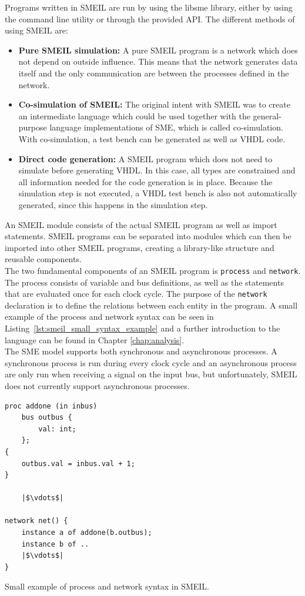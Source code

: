 Programs written in SMEIL are run by using the libsme library, either by using the command line utility or through the provided API.
The different methods of using SMEIL are:\\
\begin{itemize}
    \item \textbf{Pure SMEIL simulation:} A pure SMEIL program is a network which does not depend on outside influence. This means that the network generates data itself and the only communication are between the processes defined in the network.
    \item \textbf{Co-simulation of SMEIL:} The original intent with SMEIL was to create an intermediate language which could be used together with the general-purpose language implementations of SME, which is called co-simulation. With co-simulation, a test bench can be generated as well as VHDL code.
    \item \textbf{Direct code generation:} A SMEIL program which does not need to simulate before generating VHDL. In this case, all types are constrained and all information needed for the code generation is in place. Because the simulation step is not executed, a VHDL test bench is also not automatically generated, since this happens in the simulation step.
\end{itemize}
An SMEIL module consists of the actual SMEIL program as well as import statements. SMEIL programs can be separated into modules which can then be imported into other SMEIL programs, creating a library-like structure and reusable components.\\

The two fundamental components of an SMEIL program is \texttt{process} and \texttt{network}. The process consists of variable and bus definitions, as well as the statements that are evaluated once for each clock cycle. The purpose of the \texttt{network} declaration is to define the relations between each entity in the program. A small example of the process and network syntax can be seen in Listing~\ref{lst:smeil_small_syntax_example} and a further introduction to the language can be found in Chapter \ref{chap:analysis}.\\

The SME model supports both synchronous and asynchronous processes. A synchronous process is run during every clock cycle and an asynchronous process are only run when receiving a signal on the input bus, but unfortunately, SMEIL does not currently support asynchronous processes. %
\begin{listing}
\begin{verbatim}
proc addone (in inbus)
    bus outbus {
        val: int;
    };
{
    outbus.val = inbus.val + 1;
}

    |$\vdots$|

network net() {
    instance a of addone(b.outbus);
    instance b of ..
    |$\vdots$|
}
\end{verbatim}
\caption{Small example of process and network syntax in SMEIL.}
\label{lst:smeil_small_syntax_example}
\end{listing}
